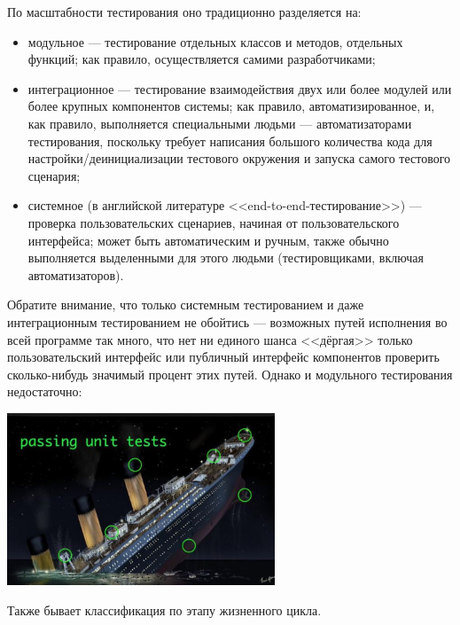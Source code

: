 \documentclass{../../text-style}
\begin{document}
По масштабности тестирования оно традиционно разделяется на:

\begin{itemize}
    \item модульное --- тестирование отдельных классов и методов, отдельных функций; как правило, осуществляется самими разработчиками;
    \item интеграционное --- тестирование взаимодействия двух или более модулей или более крупных компонентов системы; как правило, автоматизированное, и, как правило, выполняется специальными людьми --- автоматизаторами тестирования, поскольку требует написания большого количества кода для настройки/деинициализации тестового окружения и запуска самого тестового сценария;
    \item системное (в английской литературе <<end-to-end-тестирование>>) --- проверка пользовательских сценариев, начиная от пользовательского интерфейса; может быть автоматическим и ручным, также обычно выполняется выделенными для этого людьми (тестировщиками, включая автоматизаторов).
\end{itemize}

Обратите внимание, что только системным тестированием и даже интеграционным тестированием не обойтись --- возможных путей исполнения во всей программе так много, что нет ни единого шанса <<дёргая>> только пользовательский интерфейс или публичный интерфейс компонентов проверить сколько-нибудь значимый процент этих путей. Однако и модульного тестирования недостаточно:

\begin{center}
    \includegraphics[width=0.6\textwidth]{titanic.png}
\end{center}

Также бывает классификация по этапу жизненного цикла.
\end{document}
